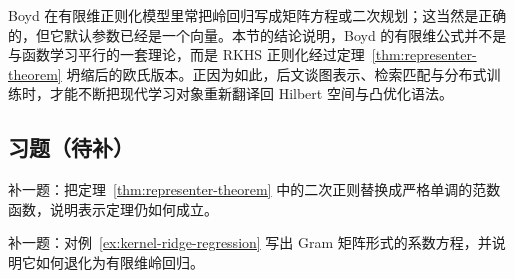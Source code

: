 Boyd 在有限维正则化模型里常把岭回归写成矩阵方程或二次规划；这当然是正确的，但它默认参数已经是一个向量。本节的结论说明，Boyd 的有限维公式并不是与函数学习平行的一套理论，而是 RKHS 正则化经过定理~\ref{thm:representer-theorem} 坍缩后的欧氏版本。正因为如此，后文谈图表示、检索匹配与分布式训练时，才能不断把现代学习对象重新翻译回 Hilbert 空间与凸优化语法。

\subsection*{习题（待补）}

\begin{exercise}[表示定理占位]
补一题：把定理~\ref{thm:representer-theorem} 中的二次正则替换成严格单调的范数函数，说明表示定理仍如何成立。
\end{exercise}

\begin{exercise}[核岭回归系数占位]
补一题：对例~\ref{ex:kernel-ridge-regression} 写出 Gram 矩阵形式的系数方程，并说明它如何退化为有限维岭回归。
\end{exercise}
